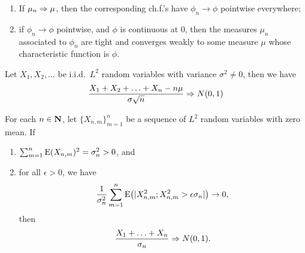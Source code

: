 \begin{thm} \leavevmode
    \begin{enumerate}
        \item If $\mu_n \Rightarrow \mu$, then the corresponding ch.f.'s have $\phi_n \to \phi$ pointwise everywhere;
        \item if $\phi_n \to \phi$ pointwise, and $\phi$ is continuous at $0$, then the measures $\mu_n$ associated to $\phi_n$ are tight and converges weakly to some measure $\mu$ whose characteristic function is $\phi$.
    \end{enumerate}
\end{thm}

\begin{namedthm}
    Let $X_1,X_2,\dotsc$ be i.i.d.\ $L^2$ random variables with variance $\sigma^2 \neq 0$, then we have\[
        \frac{X_1 + X_2 + \dotsc + X_n - n \mu}{\sigma \sqrt{n}} \Rightarrow N(0,1)
    \]
\end{namedthm}

\begin{namedthm}
    For each $n \in \mathbf{N}$, let $\{X_{n,m}\}_{m=1}^n$ be a sequence of $L^2$ random variables with zero mean. If \begin{enumerate}
        \item $\sum_{m=1}^n \mathop{}\!\mathrm{E} (X_{n,m})^2 = \sigma_n^2 > 0$, and 
        \item for all $\epsilon > 0$, we have \[
            \frac{1}{\sigma_n^2} \sum_{m=1}^n \mathop{}\!\mathrm{E}\bigl(\lvert X_{n,m}^2; X_{n,m}^2 > \epsilon \sigma_n \rvert\bigr) \to 0,
        \] then \[
            \frac{X_1 + \dotsc + X_n}{\sigma_n} \Rightarrow N(0,1).
        \]
    \end{enumerate}
\end{namedthm}

\begin{namedthm}
    
\end{namedthm}
